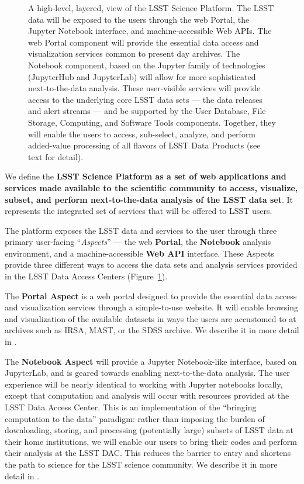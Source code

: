 \begin{figure}
\centering
{}
\caption{
A high-level, layered, view of the LSST Science Platform.  The LSST data
will be exposed to the users through the web Portal, the Jupyter Notebook
interface, and machine-accessible Web APIs.  The web Portal component will
provide the essential data access and visualization services common to
present day archives.  The Notebook component, based on the Jupyter family
of technologies (JupyterHub and JupyterLab) will allow for more
sophisticated next-to-the-data analysis.  These user-visible services will
provide access to the underlying core LSST data sets --- the data releases and
alert streams --- and be supported by the User Database, File Storage,
Computing, and Software Tools components.  Together, they will enable the
users to access, sub-select, analyze, and perform added-value processing of
all flavors of LSST Data Products (see text for detail).
\label{fig:layeredLSP}}
\end{figure}

We define the \textbf{LSST Science Platform as a set of web applications and services
made available to the scientific community to access, visualize, subset, and
perform next-to-the-data analysis of the LSST data set}. It represents the integrated
set of services that will be offered to LSST users.

The platform exposes the LSST data
and services to the user through three primary user-facing ``\emph{Aspects}'' --- the web \textbf{Portal},
the \textbf{Notebook} analysis environment, and a machine-accessible \textbf{Web API} interface.
These Aspects provide three different ways to access the data sets and analysis services provided in the LSST Data Access Centers (Figure~\ref{fig:layeredLSP}).

The \textbf{Portal Aspect} is a web portal designed to provide the essential data
access and visualization services through a simple-to-use website.  It will
enable browsing and visualization of the available datasets in ways the
users are accustomed to at archives such as IRSA, MAST, or the SDSS archive.
We describe it in more detail in .

The \textbf{Notebook Aspect} will provide a Jupyter Notebook-like interface,
based on JupyterLab, and is geared towards enabling next-to-the-data analysis.
The user experience will
be nearly identical to working with Jupyter notebooks locally, except that computation
and analysis will occur with resources provided at the LSST Data Access Center.
This is an
implementation of the ``bringing computation to the data'' paradigm: rather
than imposing the burden of downloading, storing, and processing (potentially large)
subsets of LSST data at their home institutions, we will enable our users to
bring their codes and perform their analysis at the LSST DAC.
This reduces the barrier to entry and shortens the path to science for
the LSST science community. We describe it in more detail in .

